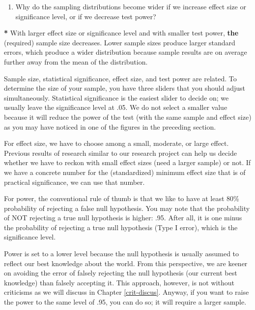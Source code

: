 \documentclass[a4paper]{book}
\newenvironment{Shaded}{\begin{snugshade}}{\end{snugshade}}
\newcommand{\KeywordTok}[1]{\textcolor[rgb]{0,0,0}{\textbf{#1}}}
\newcommand{\StringTok}[1]{\textcolor[rgb]{0.00,0.00,0.00}{#1}}
\newcommand{\OperatorTok}[1]{\textcolor[rgb]{0.00,0.00,0.00}{\textbf{#1}}}
\newcommand{\NormalTok}[1]{#1}
\providecommand{\tightlist}{%
  \setlength{\itemsep}{0pt}\setlength{\parskip}{0pt}}
\theoremstyle{definition}
\theoremstyle{definition}
\theoremstyle{definition}
\theoremstyle{remark}
\begin{document}
\begin{enumerate}
\def\labelenumi{\arabic{enumi}.}
\setcounter{enumi}{5}
\tightlist
\item
  Why do the sampling distributions become wider if we increase effect
  size or significance level, or if we decrease test power?
\end{enumerate}

\begin{Shaded}
\begin{Highlighting}[]
\OperatorTok{*}\StringTok{ }\NormalTok{With larger effect size or significance level and with smaller test power,}
\KeywordTok{the}\NormalTok{ (required) sample size decreases. Lower sample sizes produce larger}
\NormalTok{standard errors, which produce a wider distribution because sample results are}
\NormalTok{on average further away from the mean of the distribution.}
\end{Highlighting}
\end{Shaded}

Sample size, statistical significance, effect size, and test power are
related. To determine the size of your sample, you have three sliders
that you should adjust simultaneously. Statistical significance is the
easiest slider to decide on; we usually leave the significance level at
.05. We do not select a smaller value because it will reduce the power
of the test (with the same sample and effect size) as you may have
noticed in one of the figures in the preceding section.

For effect size, we have to choose among a small, moderate, or large
effect. Previous results of research similar to our research project can
help us decide whether we have to reckon with small effect sizes (need a
larger sample) or not. If we have a concrete number for the
(standardized) minimum effect size that is of practical significance, we
can use that number.

For power, the conventional rule of thumb is that we like to have at
least 80\% probability of rejecting a false null hypothesis. You may
note that the probability of NOT rejecting a true null hypothesis is
higher: .95. After all, it is one minus the probability of rejecting a
true null hypothesis (Type I error), which is the significance level.

Power is set to a lower level because the null hypothesis is usually
assumed to reflect our best knowledge about the world. From this
perspective, we are keener on avoiding the error of falsely rejecting
the null hypothesis (our current best knowledge) than falsely accepting
it. This approach, however, is not without criticisms as we will discuss
in Chapter \ref{crit-discus}. Anyway, if you want to raise the power to
the same level of .95, you can do so; it will require a larger sample.
\end{document}
